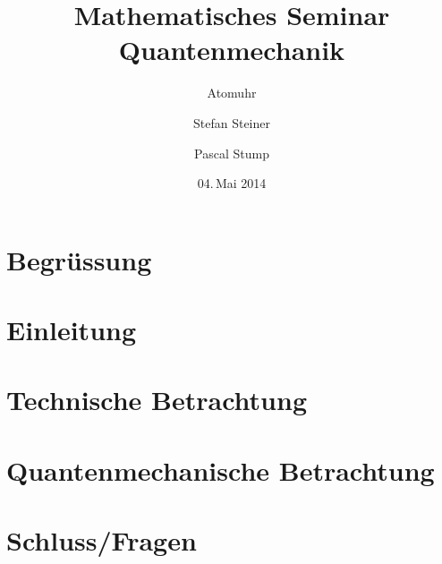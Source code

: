 \documentclass[compressd]
{beamer}
\title[MathSem QM]{Mathematisches Seminar Quantenmechanik}
\subtitle{Atomuhr}
\author{Stefan Steiner \and Pascal Stump}
\institute{HSR Hochschule für Technik Rapperswil}
\date{04.\,Mai 2014}
\begin{document}
	
	\begin{frame}
		\titlepage
	\end{frame}
	
	\section{Begrüssung}
	
	
	\section{Einleitung}
	
	
	\section[Tech]{Technische Betrachtung}
	 
	
	\section[Math]{Quantenmechanische Betrachtung}
	
	
	\section[?]{ Schluss/Fragen}
	
	
\end{document}
